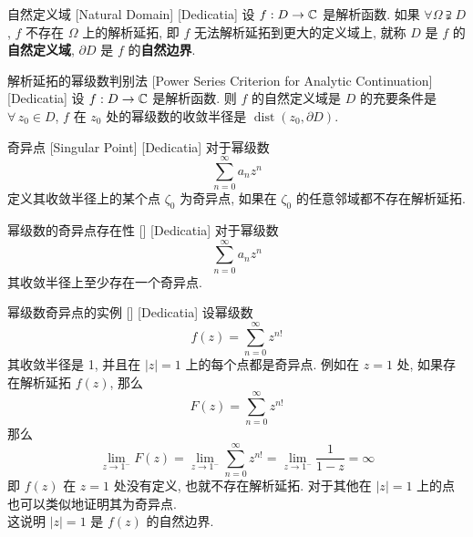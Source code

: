         \begin{dfn}
            {自然定义域}
            [Natural Domain]
            [Dedicatia]
            设 \(f:D\to\operatorname{\mathbb{C}}\) 是解析函数. 如果 \(\forall\Omega\supsetneqq D\), \(f\) 不存在 \(\Omega\) 上的解析延拓, 即 \(f\) 无法解析延拓到更大的定义域上, 就称 \(D\) 是 \(f\) 的\textbf{自然定义域}, \(\partial D\) 是 \(f\) 的\textbf{自然边界}. 
        \end{dfn}

        \begin{crl}
            {解析延拓的幂级数判别法}
            [Power Series Criterion for Analytic Continuation]
            [Dedicatia]
            设 \(f:D\to\operatorname{\mathbb{C}}\) 是解析函数. 则 \(f\) 的自然定义域是 \(D\) 的充要条件是 \(\forall\,z_0\in D\), \(f\) 在 \(z_0\) 处的幂级数的收敛半径是 \(\operatorname{dist}(z_0,\partial D)\).
        \end{crl}

        \begin{dfn}
            {奇异点}
            [Singular Point]
            [Dedicatia]
            对于幂级数
            \[\sum_{n=0}^{\infty}a_nz^n\]
            定义其收敛半径上的某个点 \(\zeta_0\) 为奇异点, 如果在 \(\zeta_0\) 的任意邻域都不存在解析延拓.
        \end{dfn}

        \begin{thm}
            {幂级数的奇异点存在性}
            []
            [Dedicatia]
            对于幂级数
            \[\sum_{n=0}^{\infty}a_nz^n\]
            其收敛半径上至少存在一个奇异点.
        \end{thm}

        \begin{xmp}
            {幂级数奇异点的实例}
            []
            [Dedicatia]
            设幂级数
            \[f(z)=\sum_{n=0}^{\infty}z^{n!}\]
            其收敛半径是 1, 并且在 \(|z|=1\) 上的每个点都是奇异点. 例如在 \(z=1\) 处, 如果存在解析延拓 \(f(z)\), 那么
            \[F(z)=\sum_{n=0}^{\infty}z^{n!}\]
            那么
            \[\lim_{z\to 1^-}F(z)=\lim_{z\to 1^-}\sum_{n=0}^{\infty}z^{n!}=\lim_{z\to 1^-}\frac{1}{1-z}=\infty\]
            即 \(f(z)\) 在 \(z=1\) 处没有定义, 也就不存在解析延拓. 对于其他在 \(|z|=1\) 上的点也可以类似地证明其为奇异点.\\
            这说明 \(|z|=1\) 是 \(f(z)\) 的自然边界.
        \end{xmp}


